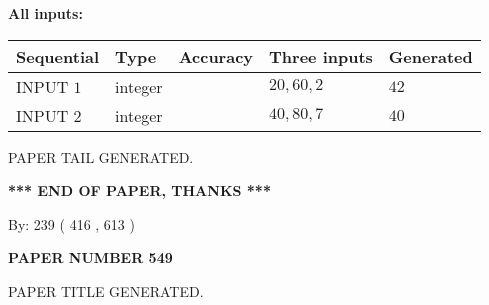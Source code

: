 \documentclass{ctexart}
\begin{document}
   
   
   
\noindent\vspace{0.1in}\hspace{-0.08in} {\textbf{\Large{All inputs: }}}
   
   
  
  
\noindent\begin{tabular}{|l|l|l|l|l|}
\hline
 Sequential & Type & Accuracy & Three inputs & Generated \\ 
\hline
 
 
  INPUT $  1 $ & integer &  & $
 20
 , 
 60
 , 
 2
 $ & $ 42 $ 
 \\  \hline  
 
 
  INPUT $  2 $ & integer &  & $
 40
 , 
 80
 , 
 7
 $ & $ 40 $ 
 \\  \hline  
 \end{tabular}
   
   
   
   
   
   
 \vspace{0.2in}
 
   
   
\vspace{2.0in} PAPER TAIL GENERATED.
   
   
   
   
\vspace{1.0in} 
{\textbf{\large{ *** END OF PAPER, THANKS *** }}} 
   
   
\hspace{1.0in} By: 
 239 ( 416 ,  613 )
   
   
   
   
\newpage 
\setcounter{page}{ 
   549001 } 
   
   
   
   
 {\textbf{ \Large{ PAPER NUMBER  549  }}}
   
   
\vspace{0.2in}
   
   
   
   
   
   
   
   
 \vspace{0.2in}
 
 
 
 
   
   
 PAPER TITLE GENERATED.
   
   
   
\vspace{0.2in}
   
\end{document}
